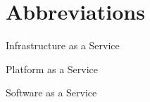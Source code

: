 \chapter*{Abbreviations}

\begin{description}
\setlength{\itemsep}{-11pt}
\setlength{\leftmargin}{900pt}

\item[IaaS] Infrastructure as a Service
\item[PaaS] Platform as a Service
\item[SaaS] Software as a Service

\end{description}
